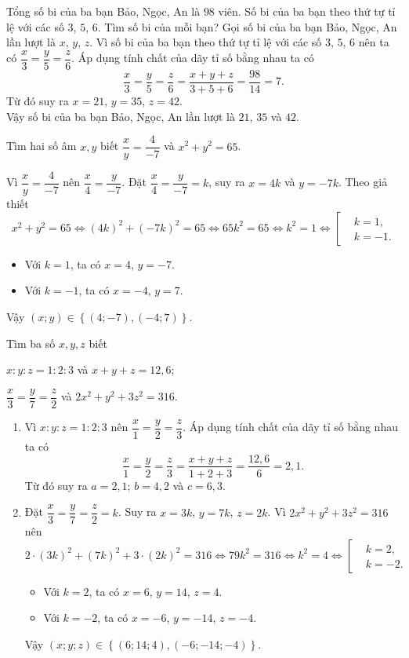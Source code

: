 \begin{vn}
Tổng số bi của ba bạn Bảo, Ngọc, An là $98$ viên. Số bi của ba bạn theo thứ tự tỉ lệ với các số $3$, $5$, $6$. Tìm số bi của mỗi bạn?
\loigiai
{
Gọi số bi của ba bạn Bảo, Ngọc, An lần lượt là $x$, $y$, $z$. Vì số bi của ba bạn theo thứ tự tỉ lệ với các số $3$, $5$, $6$ nên ta có $\dfrac{x}{3}=\dfrac{y}{5}=\dfrac{z}{6}$. Áp dụng tính chất của dãy tỉ số bằng nhau ta có $$\dfrac{x}{3}=\dfrac{y}{5}=\dfrac{z}{6}=\dfrac{x+y+z}{3+5+6}=\dfrac{98}{14}=7.$$
Từ đó suy ra $x=21$, $y=35$, $z=42$.\\
Vậy số bi của ba bạn Bảo, Ngọc, An lần lượt là $21$, $35$ và $42$.
}
\end{vn}
\begin{vn}
Tìm hai số âm $x,y$ biết $\dfrac{x}{y}=\dfrac{4}{-7}$ và $x^2+y^2=65$.
\loigiai
{
Vì $\dfrac{x}{y}=\dfrac{4}{-7}$ nên $\dfrac{x}{4}=\dfrac{y}{-7}$. Đặt $\dfrac{x}{4}=\dfrac{y}{-7}=k$, suy ra $x=4k$ và $y=-7k$. Theo giả thiết $$x^2+y^2=65\Leftrightarrow (4k)^2+(-7k)^2=65\Leftrightarrow 65k^2=65\Leftrightarrow k^2=1\Leftrightarrow \left[\begin{aligned} &k=1,\\&k=-1. \end{aligned}\right.$$
\begin{itemize}
\item Với $k=1$, ta có $x=4$, $y=-7$.
\item Với $k=-1$, ta có $x=-4$, $y=7$.
\end{itemize}
Vậy $(x;y)\in\left\{(4;-7), (-4;7)\right\}$.
}
\end{vn}
\begin{vn}
Tìm ba số $x,y,z$ biết 
\begin{listEX}[2]
\item $x:y:z=1:2:3$ và $x+y+z=12{,}6$;
\item $\dfrac{x}{3}=\dfrac{y}{7}=\dfrac{z}{2}$ và $2x^2+y^2+3z^2=316$.
\end{listEX}
\loigiai
{
\begin{enumerate}
\item Vì $x:y:z=1:2:3$ nên $\dfrac{x}{1}=\dfrac{y}{2}=\dfrac{z}{3}$. Áp dụng tính chất của dãy tỉ số bằng nhau ta có
\[ \dfrac{x}{1}=\dfrac{y}{2}=\dfrac{z}{3}=\dfrac{x+y+z}{1+2+3}=\dfrac{12,6}{6}=2,1. \]
Từ đó suy ra $a=2,1$; $b=4,2$ và $c=6,3$.
\item  Đặt $\dfrac{x}{3}=\dfrac{y}{7}=\dfrac{z}{2}=k$. Suy ra $x=3k$, $y=7k$, $z=2k$. Vì $2x^2+y^2+3z^2=316$ nên
\[2\cdot (3k)^2+(7k)^2+3\cdot (2k)^2=316\Leftrightarrow 79k^2=316\Leftrightarrow k^2=4\Leftrightarrow \left[\begin{aligned} &k=2,\\&k=-2. \end{aligned}\right.\]
\begin{itemize}
\item Với $k=2$, ta có $x=6$, $y=14$, $z=4$.
\item Với $k=-2$, ta có $x=-6$, $y=-14$, $z=-4$.
\end{itemize}
Vậy $(x;y;z)\in\left\{(6;14;4), (-6;-14;-4)\right\}$.
\end{enumerate}
}
\end{vn}
